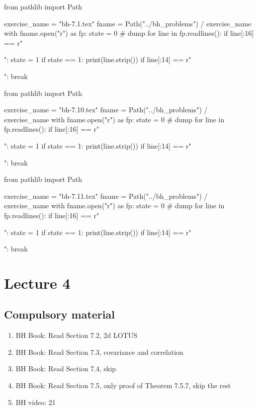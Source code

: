 \begin{pycode}
from pathlib import Path

exercise_name = "bh-7.1.tex"
fname = Path("../bh_problems") / exercise_name
with fname.open("r") as fp:
    state = 0  # dump
    for line in fp.readlines():
        if line[:16] == r"\begin{exercise}":
            state = 1
        if state == 1:
            print(line.strip())
        if line[:14] == r"\end{exercise}":
            break
\end{pycode}

\begin{pycode}
from pathlib import Path

exercise_name = "bh-7.10.tex"
fname = Path("../bh_problems") / exercise_name
with fname.open("r") as fp:
    state = 0  # dump
    for line in fp.readlines():
        if line[:16] == r"\begin{exercise}":
            state = 1
        if state == 1:
            print(line.strip())
        if line[:14] == r"\end{exercise}":
            break
\end{pycode}


\begin{pycode}
from pathlib import Path

exercise_name = "bh-7.11.tex"
fname = Path("../bh_problems") / exercise_name
with fname.open("r") as fp:
    state = 0  # dump
    for line in fp.readlines():
        if line[:16] == r"\begin{exercise}":
            state = 1
        if state == 1:
            print(line.strip())
        if line[:14] == r"\end{exercise}":
            break
\end{pycode}

\section{Lecture 4}

\subsection{Compulsory material}

\begin{enumerate}
\item BH Book: Read Section 7.2, 2d LOTUS
\item BH Book: Read Section 7.3, covariance and correlation
\item BH Book: Read Section 7.4, skip
\item BH Book: Read Section 7.5, only proof of Theorem 7.5.7, skip the rest
\item BH video: 21
\end{enumerate}



